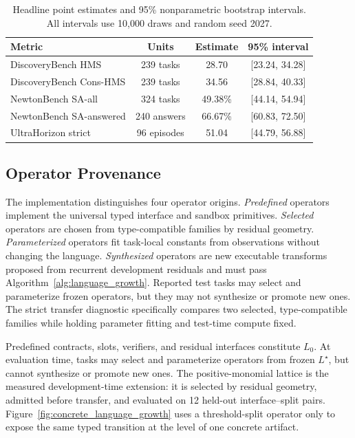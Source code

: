 \documentclass[letterpaper]{article}
\newcommand{\tblhdr}{\rowcolor{headerrow}}
\begin{document}
\begin{table}[!htbp]
\centering
\small
\begin{tabularx}{0.92\textwidth}{|Y|c|c|c|}
\hline
\tblhdr
Metric & Units & Estimate & 95\% interval \\
\hline
DiscoveryBench HMS & 239 tasks & 28.70 & [23.24, 34.28] \\
\hline
DiscoveryBench Cons-HMS & 239 tasks & 34.56 & [28.84, 40.33] \\
\hline
NewtonBench SA-all & 324 tasks & 49.38\% & [44.14, 54.94] \\
\hline
NewtonBench SA-answered & 240 answers & 66.67\% & [60.83, 72.50] \\
\hline
UltraHorizon strict & 96 episodes & 51.04 & [44.79, 56.88] \\
\hline
\end{tabularx}
\caption{Headline point estimates and 95\% nonparametric bootstrap intervals.
All intervals use 10,000 draws and random seed 2027.}
\label{tab:bootstrap_ci}
\end{table}

\subsection*{Operator Provenance}

The implementation distinguishes four operator origins. \emph{Predefined}
operators implement the universal typed interface and sandbox primitives.
\emph{Selected} operators are chosen from type-compatible families by residual
geometry. \emph{Parameterized} operators fit task-local constants from
observations without changing the language. \emph{Synthesized} operators are
new executable transforms proposed from recurrent development residuals and
must pass Algorithm~\ref{alg:language_growth}. Reported test tasks may select
and parameterize frozen operators, but they may not synthesize or promote new
ones. The strict transfer diagnostic specifically compares two selected,
type-compatible families while holding parameter fitting and test-time compute
fixed.

Predefined contracts, slots, verifiers, and residual interfaces constitute
$L_0$.  At evaluation time, tasks may select and parameterize operators from
frozen $L^\star$, but cannot synthesize or promote new ones.  The
positive-monomial lattice is the measured development-time extension: it is
selected by residual geometry, admitted before transfer, and evaluated on
12 held-out interface--split pairs.  Figure~\ref{fig:concrete_language_growth}
uses a threshold-split operator only to expose the same typed transition at
the level of one concrete artifact.
\end{document}
